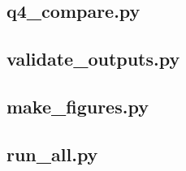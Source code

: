 \documentclass[UTF8,11pt,a4paper]{ctexart}
\begin{document}
\subsection{q4\_compare.py}
\subsection{validate\_outputs.py}
\subsection{make\_figures.py}
\subsection{run\_all.py}
\end{document}

